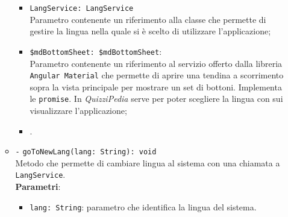 \begin{itemize}
\begin{itemize}
\begin{itemize}
			\item \texttt{LangService: LangService} \\
			Parametro contenente un riferimento alla classe che permette di gestire la lingua nella quale si è scelto di utilizzare l'applicazione;
			\item \texttt{\$mdBottomSheet: \$mdBottomSheet}: \\
			Parametro contenente un riferimento al servizio offerto dalla libreria \texttt{Angular Material} che permette di aprire una tendina a scorrimento sopra la vista principale per mostrare un set di bottoni. Implementa le \texttt{promise}. In \textit{QuizziPedia} serve per poter scegliere la lingua con sui visualizzare l'applicazione;
			\item \scopeP.
		\end{itemize}
		\item \texttt{-} \texttt{goToNewLang(lang: String): void} \\ Metodo che permette di cambiare lingua al sistema con una chiamata a \texttt{LangService}.\\
		\textbf{Parametri}:
		\begin{itemize}
			\item \texttt{lang: String}: parametro che identifica la lingua del sistema.
		\end{itemize}
	
	\end{itemize}
\end{itemize}

